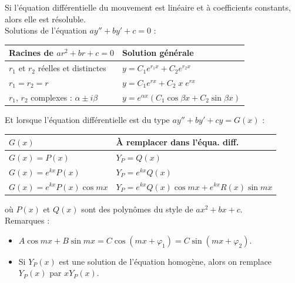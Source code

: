 \documentclass[a4paper]{article}
\begin{document}
\begin{tcolorbox}[title=A. Équation de Newton intégrable, colback=white, colframe=violet!80, sharp corners]

Si l'équation différentielle du mouvement est linéaire et à coefficients constants, alors elle est résoluble. \\
Solutions de l'équation $\displaystyle a y'' + b y' + c = 0 $ : 
\begin{center} \begin{tabular}{|p{6cm}|p{6cm}|}
\hline
Racines de $ a r^2 + b r + c = 0 $ & Solution générale \\
\hline
$ r_1 $ et $ r_2 $ réelles et distinctes & $\displaystyle y = C_1 e^{r_1 x} + C_2 e^{r_2 x} $ \\
$ r_1 = r_2 = r $ & $\displaystyle y = C_1 e^{r x} + C_2 \; x \; e^{r x} $ \\
$ r_1 $, $ r_2 $ complexes : $ \alpha \pm i \beta $ & $\displaystyle y = e^{\alpha x} (C_1 \cos \beta x + C_2 \sin \beta x) $ \\
\hline
\end{tabular} \end{center}
Et lorsque l'équation différentielle est du type $ a y'' + b y' + c y = G(x) $ : 
\begin{center} \begin{tabular}{|p{6cm}|p{6cm}|}
\hline
$ G(x) $ & À remplacer dans l'équa. diff. \\
\hline
$ G(x) = P(x) $ & $ Y_P = Q(x) $ \\
$ G(x) = e^{k x} P(x) $ & $ Y_P = e^{k x} Q(x) $ \\
$ G(x) = e^{k x} P(x) \cos m x $ & $ Y_P = e^{k x} Q(x) \cos m x + e^{k x} R(x) \sin m x $ \\
\hline
\end{tabular} \end{center}
où $ P(x) $ et $ Q(x) $ sont des polynômes du style de $ a x^2 + b x + c $. \\
Remarques : 
\begin{itemize}
\item $ A \cos m x + B \sin m x = C \cos ( m x + \varphi_1 ) = C \sin ( m x + \varphi_2 ) $.
\item Si $ Y_P(x) $ est une solution de l'équation homogène, alors on remplace $ Y_P(x) $ par $ x Y_P(x) $.
\end{itemize}

\end{tcolorbox}
\end{document}
